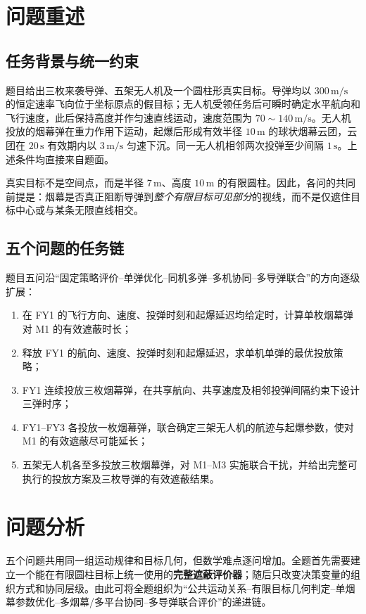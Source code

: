 \section{问题重述}

\subsection{任务背景与统一约束}
题目给出三枚来袭导弹、五架无人机及一个圆柱形真实目标。导弹均以 $300\,\mathrm{m/s}$ 的恒定速率飞向位于坐标原点的假目标；无人机受领任务后可瞬时确定水平航向和飞行速度，此后保持高度并作匀速直线运动，速度范围为 $70\sim140\,\mathrm{m/s}$。无人机投放的烟幕弹在重力作用下运动，起爆后形成有效半径 $10\,\mathrm m$ 的球状烟幕云团，云团在 $20\,\mathrm s$ 有效期内以 $3\,\mathrm{m/s}$ 匀速下沉。同一无人机相邻两次投弹至少间隔 $1\,\mathrm s$。上述条件均直接来自题面\cite{ref1}。

真实目标不是空间点，而是半径 $7\,\mathrm m$、高度 $10\,\mathrm m$ 的有限圆柱。因此，各问的共同前提是：烟幕是否真正阻断导弹到\emph{整个有限目标可见部分}的视线，而不是仅遮住目标中心或与某条无限直线相交。

\subsection{五个问题的任务链}
题目五问沿“固定策略评价--单弹优化--同机多弹--多机协同--多导弹联合”的方向逐级扩展：
\begin{enumerate}[label=\arabic*.]
  \item 在 FY1 的飞行方向、速度、投弹时刻和起爆延迟均给定时，计算单枚烟幕弹对 M1 的有效遮蔽时长；
  \item 释放 FY1 的航向、速度、投弹时刻和起爆延迟，求单机单弹的最优投放策略；
  \item FY1 连续投放三枚烟幕弹，在共享航向、共享速度及相邻投弹间隔约束下设计三弹时序；
  \item FY1--FY3 各投放一枚烟幕弹，联合确定三架无人机的航迹与起爆参数，使对 M1 的有效遮蔽尽可能延长；
  \item 五架无人机各至多投放三枚烟幕弹，对 M1--M3 实施联合干扰，并给出完整可执行的投放方案及三枚导弹的有效遮蔽结果。
\end{enumerate}

\section{问题分析}

五个问题共用同一组运动规律和目标几何，但数学难点逐问增加。全题首先需要建立一个能在有限圆柱目标上统一使用的\textbf{完整遮蔽评价器}；随后只改变决策变量的组织方式和协同层级。由此可将全题组织为“公共运动关系--有限目标几何判定--单烟幕参数优化--多烟幕/多平台协同--多导弹联合评价”的递进链。

